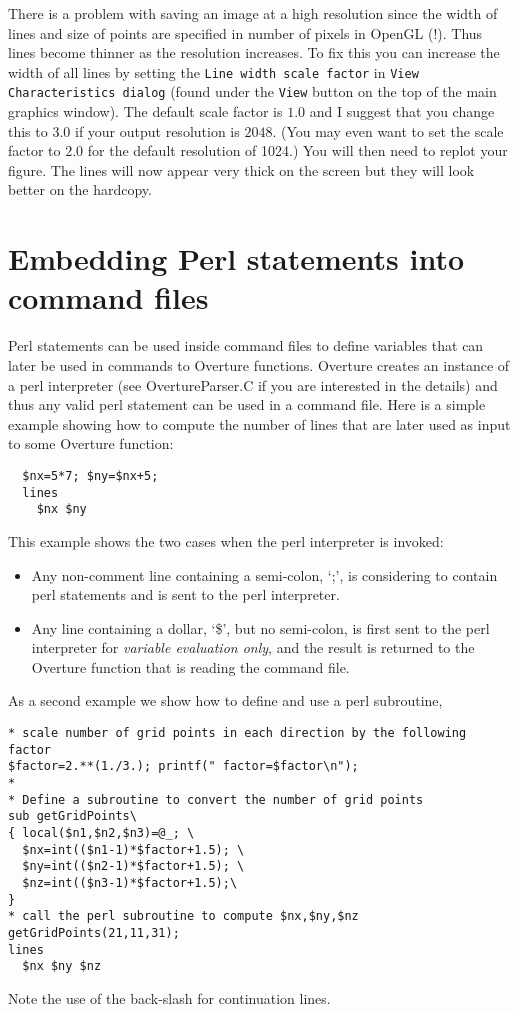 \documentclass{article}
\begin{document}
There is a problem with saving an image at a high resolution since the width of
lines and size of points are specified in number of pixels in OpenGL (!). Thus
lines become thinner as the resolution increases. To fix this you can increase
the width of all lines by setting the {\tt Line width scale factor} in {\tt View
Characteristics dialog} (found under the {\tt View} button on the top of the
main graphics window). The default scale factor is $1.0$ and I suggest that you
change this to $3.0$ if your output resolution is $2048$. (You may even want to
set the scale factor to $2.0$ for the default resolution of 1024.)  You will
then need to replot your figure. The lines will now appear very thick on the
screen but they will look better on the hardcopy. 


\section{Embedding Perl statements into command files}

Perl statements can be used inside command files to define variables that
can later be used in commands to Overture functions.
Overture creates an instance of a perl interpreter (see OvertureParser.C if you are
interested in the details)
and thus any valid perl statement can be used in a command file.
Here is a simple example showing how to compute the number of lines 
that are later used as input to some Overture function:
\begin{verbatim}
  $nx=5*7; $ny=$nx+5;
  lines
    $nx $ny
\end{verbatim}
This example shows the two cases when the perl interpreter is invoked:
\begin{itemize}
  \item Any non-comment line containing a semi-colon, `;', is considering to contain
    perl statements and is sent to the perl interpreter. 
  \item Any line containing a dollar, `\$',
   but no semi-colon, is first sent to the perl interpreter for {\em variable evaluation only}, and
   the result is returned to the Overture function that is reading the command file.
\end{itemize}
As a second example we show how to define and use a perl subroutine,
\begin{verbatim}
* scale number of grid points in each direction by the following factor
$factor=2.**(1./3.); printf(" factor=$factor\n");
*
* Define a subroutine to convert the number of grid points
sub getGridPoints\
{ local($n1,$n2,$n3)=@_; \
  $nx=int(($n1-1)*$factor+1.5); \
  $ny=int(($n2-1)*$factor+1.5); \
  $nz=int(($n3-1)*$factor+1.5);\
}
* call the perl subroutine to compute $nx,$ny,$nz
getGridPoints(21,11,31);
lines
  $nx $ny $nz
\end{verbatim}
Note the use of the back-slash for continuation lines.
\end{document}
